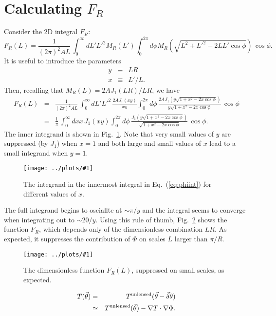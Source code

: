 \documentclass[prd,amsmath,amssymb,floatfix,superscriptaddress,nofootinbib]{revtex4-1}
\def\be{\begin{equation}}
\def\ee{\end{equation}}
\def\bea{\begin{eqnarray}}
\def\eea{\end{eqnarray}}
\newcommand{\vs}{\nonumber\\}
\newcommand{\ec}[1]{Eq.~(\ref{eq:#1})}
\newcommand{\eql}[1]{\label{eq:#1}}
\newcommand{\rf}[1]{\ref{fig:#1}}
\newcommand{\sfigg}[2]{
\texttt{[image: ../plots/\#1]}
        }
\newcommand{\Spng}[2]{
   \begin{figure}[thbp]
   \begin{center}
    \sfigg{../plots/#1.png}{.7\columnwidth}
    \caption{{\small #2}}
    \label{fig:#1}
     \end{center}
   \end{figure}
}
\begin{document}
\section{Calculating $F_R$}
Consider the 2D integral $F_R$:
\be
 F_R(L) = \frac1{(2\pi)^2AL}\, \int_0^\infty dL' L'^2 M_R(L')  \int_0^{2\pi} d\phi M_R\left(\sqrt{L^2+L'^2-2LL'\cos\phi}\right)  \,\cos\phi.\ee
 It is useful to introduce the parameters
 \bea
 y &\equiv& LR\vs
 x &\equiv& L'/L.\eea
 Then, recalling that $M_R(L) = 2A J_1(LR)/LR$, we have
 \bea
 F_R(L) &=& \frac1{(2\pi)^2AL}\, \int_0^\infty dL' L'^2 \, \frac{2AJ_1(xy)}{xy} \int_0^{2\pi} d\phi \,\frac{2A J_1(y\sqrt{1+x^2-2x\cos\phi})}{y\sqrt{1+x^2-2x\cos\phi}}
 \,\cos\phi
 \vs
 &=&\frac{1}{\pi}\, \int_0^\infty dx x \, {J_1(xy)}\int_0^{2\pi} d\phi \,\frac{J_1(y\sqrt{1+x^2-2x\cos\phi})}{\sqrt{1+x^2-2x\cos\phi}}
 \,\cos\phi.\eql{phiint}
 \eea
 The inner integrand is shown in Fig.~\rf{phiinty}. Note that very small values of $y$ are suppressed (by $J_1$) when $x=1$ and both large and small values of $x$ lead to a small integrand when $y=1$. %
 \Spng{phiinty}{The integrand in the innermost integral in \ec{phiint} for different values of $x$.}
 The full integrand begins to osciallte at $\sim\pi/y$ and the integral seems to converge when integrating out to $\sim20/y$. Using this rule of thumb, Fig.~\rf{mr} shows the function $F_R$, 
 which depends only of the dimensionless combination $LR$. As expected, it suppresses the contribution of $\Phi$ on scales $L$ larger than $\pi/R$.
 \Spng{mr}{The dimensionless function $F_R(L)$, suppressed on small scales, as expected.}


\bea T(\vec\theta) &=& T^{\rm unlensed}(\vec\theta-\vec\delta\theta)\vs
&\simeq&
T^{\rm unlensed}(\vec\theta) - \nabla T\cdot \nabla\Phi.\eea


\end{document}
